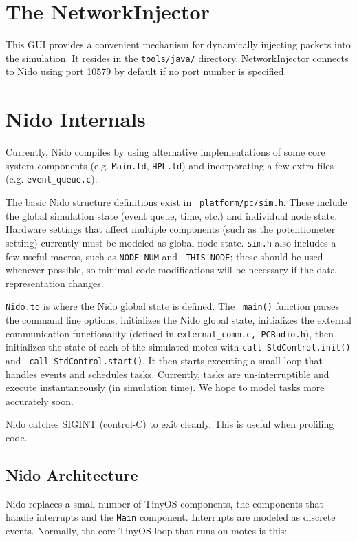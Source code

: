 \documentclass[10pt]{article}
\begin{document}
\section*{The NetworkInjector}

This GUI provides a convenient mechanism for dynamically injecting
packets into the simulation. It resides in the {\tt tools/java/}
directory. NetworkInjector connects to Nido using port 10579 by
default if no port number is specified.

\section*{Nido Internals}

Currently, Nido compiles by using alternative implementations of
some core system components (e.g. {\tt Main.td}, {\tt HPL.td}) and
incorporating a few extra files (e.g. {\tt event\_queue.c}). 

The basic Nido structure definitions exist in {\tt
platform/pc/sim.h}. These include the global simulation state
(event queue, time, etc.) and individual node state. Hardware settings
that affect multiple components (such as the potentiometer setting)
currently must be modeled as global node state. {\tt sim.h} also
includes a few useful macros, such as {\tt NODE\_NUM} and {\tt
THIS\_NODE}; these should be used whenever possible, so minimal code
modifications will be necessary if the data representation
changes. 

{\tt Nido.td} is where the Nido global state is defined. The {\tt
main()} function parses the command line options, initializes the
Nido global state, initializes the external communication
functionality (defined in {\tt external\_comm.c, PCRadio.h}), then initializes the
state of each of the simulated motes with {\tt call StdControl.init()} and {\tt
call StdControl.start()}. It then starts executing a small loop that handles
events and schedules tasks. Currently, tasks are un-interruptible and
execute instantaneously (in simulation time). We hope to model tasks
more accurately soon.

Nido catches SIGINT (control-C) to exit cleanly. This is useful when
profiling code.

\subsection*{Nido Architecture}

Nido replaces a small number of TinyOS components, the components
that handle interrupts and the {\tt Main} component. Interrupts are
modeled as discrete events. Normally, the core TinyOS loop that runs
on motes is this:
\end{document}
